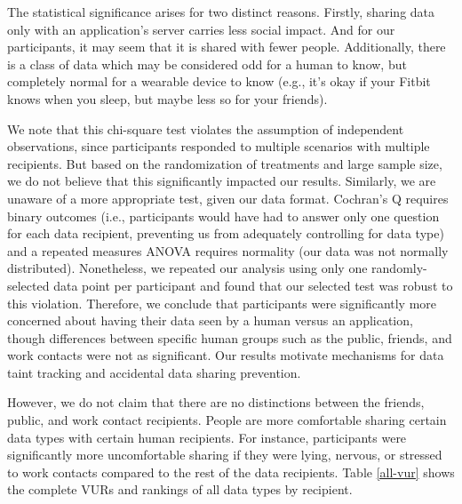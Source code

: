 \documentclass[conference]{IEEEtran}
\begin{document}
The statistical significance arises for two distinct reasons. Firstly, sharing data only with an application's server carries less social impact. And for our participants, it may seem that it is shared with fewer people. Additionally, there is a class of data which may be considered odd for a human to know, but completely normal for a wearable device to know (e.g., it's okay if your Fitbit knows when you sleep, but maybe less so for your friends).

We note that this chi-square test violates the assumption of independent observations, since participants responded to multiple scenarios with multiple recipients. But based on the randomization of treatments and large sample size, we do not believe that this significantly impacted our results. Similarly, we are unaware of a more appropriate test, given our data format. Cochran's Q requires binary outcomes (i.e., participants would have had to answer only one question for each data recipient, preventing us from adequately controlling for data type) and a repeated measures ANOVA requires normality (our data was not normally distributed). Nonetheless, we repeated our analysis using only one randomly-selected data point per participant and found that our selected test was robust to this violation. Therefore, we conclude that participants were significantly more concerned about having their data seen by a human versus an application, though differences between specific human groups such as the public, friends, and work contacts were not as significant. Our results motivate mechanisms for data taint tracking and accidental data sharing prevention.

However, we do not claim that there are no distinctions between the friends, public, and work contact recipients. People are more comfortable sharing certain data types with certain human recipients. For instance, participants were significantly more uncomfortable sharing if they were lying, nervous, or stressed to work contacts compared to the rest of the data recipients. Table \ref{all-vur} shows the complete VURs and rankings of all data types by recipient.\\
\end{document}
